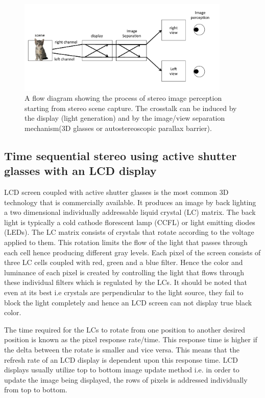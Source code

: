 \begin{figure}
\centering
    \includegraphics[width=0.9\textwidth]{./Template_Figures/ct_flow}
    \caption{A flow diagram showing the process of stereo image perception starting from stereo scene capture. The crosstalk can be induced by the display (light generation) and by the image/view separation mechanism(3D glasses or autostereoscopic parallax barrier).\label{fig:ctflow}}
\end{figure}

\subsection{Time sequential stereo using active shutter glasses with an LCD display}
LCD screen coupled with active shutter glasses is the most common 3D technology that is commercially available. It produces an image by back lighting a two dimensional individually addressable liquid crystal (LC) matrix. The back light is typically a cold cathode florescent lamp (CCFL) or light emitting diodes (LEDs). The LC matrix consists of crystals that rotate according to the voltage applied to them. This rotation limits the flow of the light that passes through each cell hence producing different gray levels. Each pixel of the screen consists of three LC cells coupled with red, green and a blue filter. Hence the color and luminance of each pixel is created by controlling the light that flows through these individual filters which is regulated by the LCs. It should be noted that even at its best i.e crystals are perpendicular to the light source, they fail to block the light completely and hence an LCD screen can not display true black color.

The time required for the LCs to rotate from one position to another desired position is known as the pixel response rate/time. This response time is higher if the delta between the rotate is smaller and vice versa\cite{woods2012crosstalk}. This means that the refresh rate of an LCD display is dependent upon this response time. LCD displays usually utilize top to bottom image update method i.e. in order to update the image being displayed, the rows of pixels is addressed individually from top to bottom.

